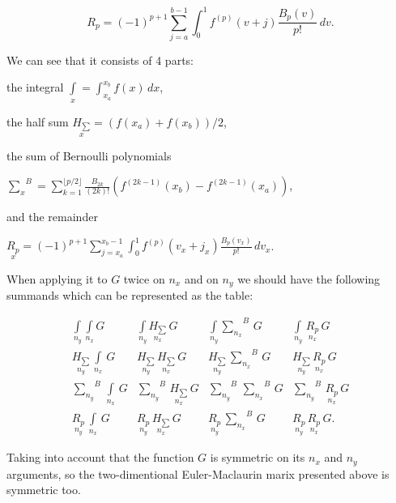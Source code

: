 \documentclass[twoside, 10pt]{article}
\begin{document}
\begin{multicols}{2}
\begin{equation} \label{eq:10}
{\displaystyle R_{p}=(-1)^{p+1}\sum_{j=a}^{b-1} \int _{0}^{1}f^{(p)}(v+j){\frac {B_{p}(v)}{p!}}\,dv}.
\end{equation}

We can see that it consists of 4 parts:

\noindent
the integral \(\int\limits_{x}^{}=\int _{x_a}^{x_b}f(x)\,dx\),

\noindent
the half sum \(\underset{x}{H_{\sum}}={\left( {f(x_a)+f(x_b)}\right)/{2}}\),

\noindent
the sum of Bernoulli polynomials

\({\sum\limits_{x}^{}}^{B}=\sum _{k=1}^{\lfloor p/2\rfloor }{\frac {B_{2k}}{(2k)!}}\left(f^{(2k-1)}(x_b)-f^{(2k-1)}(x_a)\right)\),

\noindent
and the remainder

\(\underset{x}{R_{p}}=(-1)^{p+1}\sum_{j=x_a}^{x_b-1} \int _{0}^{1}f^{(p)}(v_x+j_x){\frac {B_{p}(v_x)}{p!}}\,dv_x\).

When applying it to \(G\) twice on \(n_x\) and on \(n_y\) we should have
the following summands which can be represented as the table:

    \begin{equation} \label{eq:11}
\begin{array}{cccc}
 \int\limits_{n_y}^{} \int\limits_{n_x}^{} G  &  \int\limits_{n_y}^{} \underset{n_x}{H_{\sum}}\,G  &  \int\limits_{n_y}^{}{\sum\limits_{n_x}^{}}^{B}\,G  &  \int\limits_{n_y}^{}\,\underset{n_x}{R_{p}}\,G  \\
 \underset{n_y}{H_{\sum}}\,\int\limits_{n_x}^{}\,G &  \underset{n_y}{H_{\sum}}\,\underset{n_x}{H_{\sum}}\,G &  \underset{n_y}{H_{\sum}}\,{\sum\limits_{n_x}^{}}^{B}\,G &  \underset{n_y}{H_{\sum}}\,\underset{n_x}{R_{p}}\,G \\
 {\sum\limits_{n_y}^{}}^{B}\,\int\limits_{n_x}^{}\,G  &  {\sum\limits_{n_y}^{}}^{B}\,\underset{n_x}{H_{\sum}}\,G  &  {\sum\limits_{n_y}^{}}^{B}\,{\sum\limits_{n_x}^{}}^{B}\,G  &  {\sum\limits_{n_y}^{}}^{B}\,\underset{n_x}{R_{p}}\,G  \\
 \underset{n_y}{R_{p}}\,\int\limits_{n_x}^{}\,G   &  \underset{n_y}{R_{p}}\,\underset{n_x}{H_{\sum}}\,G   &  \underset{n_y}{R_{p}}\,{\sum\limits_{n_x}^{}}^{B}\,G   &  \underset{n_y}{R_{p}}\,\underset{n_x}{R_{p}}\,G.
\end{array}\end{equation}

    Taking into account that the function \(G\) is symmetric on
its \(n_x\) and \(n_y\) arguments, so the two-dimentional
Euler-Maclaurin marix presented above is symmetric too.


\end{multicols}
\end{document}
